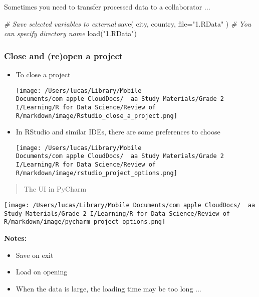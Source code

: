 \documentclass[
]{article}
\let\oldincludegraphics\includegraphics
\renewcommand{\includegraphics}[2][]{\begin{center}\oldincludegraphics[#1]{#2}\end{center}}
\newenvironment{Shaded}{}{}
\newcommand{\AttributeTok}[1]{\textcolor[rgb]{0.49,0.56,0.16}{#1}}
\newcommand{\CommentTok}[1]{\textcolor[rgb]{0.38,0.63,0.69}{\textit{#1}}}
\newcommand{\FunctionTok}[1]{\textcolor[rgb]{0.02,0.16,0.49}{#1}}
\newcommand{\NormalTok}[1]{#1}
\newcommand{\StringTok}[1]{\textcolor[rgb]{0.25,0.44,0.63}{#1}}
\begin{document}
Sometimes you need to transfer processed data to a collaborator ...

\begin{Shaded}
\begin{Highlighting}[]
\CommentTok{\# Save selected variables to external}
\FunctionTok{save}\NormalTok{(}
\NormalTok{  city, }
\NormalTok{  country, }
  \AttributeTok{file=}\StringTok{"1.RData"}
\NormalTok{)}
\CommentTok{\# You can specify directory name}
\FunctionTok{load}\NormalTok{(}\StringTok{"1.RData"}\NormalTok{)}
\end{Highlighting}
\end{Shaded}

\hypertarget{close-and-reopen-a-project}{%
\subsubsection{Close and (re)open a
project}\label{close-and-reopen-a-project}}

\begin{itemize}
\item
  To close a project

  \texttt{[image: /Users/lucas/Library/Mobile Documents/com~apple~CloudDocs/~~aa Study Materials/Grade 2 I/Learning/R for Data Science/Review of R/markdown/image/Rstudio\_close\_a\_project.png]}
\item
  In RStudio and similar IDEs, there are some preferences to choose

  \texttt{[image: /Users/lucas/Library/Mobile Documents/com~apple~CloudDocs/~~aa Study Materials/Grade 2 I/Learning/R for Data Science/Review of R/markdown/image/rstudio\_project\_options.png]}
\end{itemize}

\begin{quote}
The UI in PyCharm
\end{quote}

\texttt{[image: /Users/lucas/Library/Mobile Documents/com~apple~CloudDocs/~~aa Study Materials/Grade 2 I/Learning/R for Data Science/Review of R/markdown/image/pycharm\_project\_options.png]}

\textbf{Notes:}

\begin{itemize}
\item
  Save on exit
\item
  Load on opening
\item
  When the data is large, the loading time may be too long ...
\end{itemize}
\end{document}
